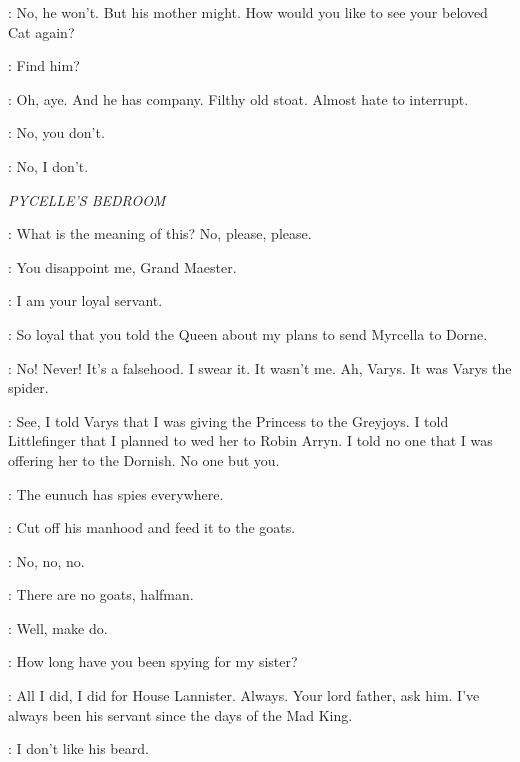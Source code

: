\TYRION: No, he won't. But his mother might. How would you like to see your beloved Cat again? 


\TYRION: Find him? 

\BRONN: Oh, aye. And he has company. Filthy old stoat. Almost hate to interrupt. 

\TYRION: No, you don't. 

\BRONN: No, I don't. 



\scene

\textit{PYCELLE'S BEDROOM}


\PYCELLE: What is the meaning of this? No, please, please. 

\TYRION: You disappoint me, Grand Maester. 

\PYCELLE: I am your loyal servant. 

\TYRION: So loyal that you told the Queen about my plans to send Myrcella to Dorne. 

\PYCELLE: No! Never! It's a falsehood. I swear it. It wasn't me. Ah, Varys. It was Varys the spider. 

\TYRION: See, I told Varys that I was giving the Princess to the Greyjoys. I told Littlefinger that I planned to wed her to Robin Arryn. I told no one that I was offering her to the Dornish. No one but you. 

\PYCELLE: The eunuch has spies everywhere. 

\TYRION: Cut off his manhood and feed it to the goats. 

\PYCELLE: No, no, no. 

\TIMETT: There are no goats, halfman. 

\TYRION: Well, make do. 


\TYRION: How long have you been spying for my sister? 

\PYCELLE: All I did, I did for House Lannister. Always. Your lord father, ask him. I've always been his servant since the days of the Mad King. 

\TYRION: I don't like his beard. 


